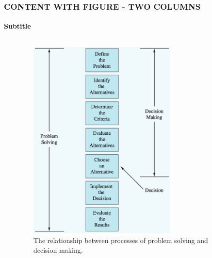 \documentclass[14 pt]{beamer}
\begin{document}
\begin{frame}[t]
\frametitle{CONTENT WITH FIGURE - TWO COLUMNS}
\framesubtitle{Subtitle}

\begin{columns}[t]
\begin{column}{0.45\textwidth}
\lipsum[7]
\vskip0.5cm%
\lipsum[8]
\end{column}
\begin{column}{0.45\textwidth}
\begin{figure}[t]
\includegraphics[width=0.7\textwidth]{img/problem-solving-decision-making}
\caption{The relationship between processes of problem solving and decision making.}
\end{figure}

\end{column}
\end{columns}
\end{frame}

\end{document}
